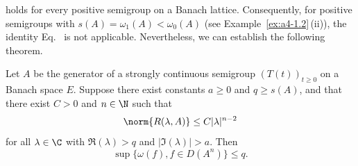 holds for every positive semigroup on a Banach lattice. 
Consequently, for positive semigroups with $s(A) = \omega_1(A) < \omega_{0}(A)$ (see Example~\ref{ex:a4-1.2}\,(ii)), the identity Eq.~ is not applicable. 
Nevertheless, we can establish the following theorem.
\begin{theorem}\label{thm:a4-1.9}
Let $A$ be the generator of a strongly continuous semigroup $(T(t))_{t \geq 0}$ on a Banach space $E$. 
Suppose there exist constants $a \geq 0$ and $q \geq s(A)$, and that there exist $C > 0$ and $n \in \N$ such that 
\[
    \norm{ R(\lambda, A) } \leq C | \lambda |^{n-2}
\]
for all $\lambda \in \C$ with $\Re(\lambda) > q$ and $| \Im(\lambda) | > a$. 
Then
\[
    \sup \{ \omega(f),  f \in D(A^n) \} \leq q.
\]
\end{theorem}
